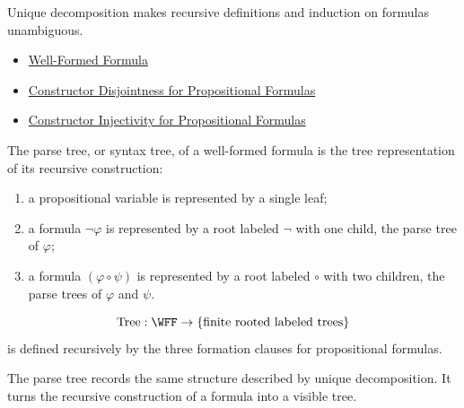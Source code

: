 \begin{remark*}[Interpretation]
Unique decomposition makes recursive definitions and induction on formulas unambiguous.
\end{remark*}

\begin{dependencies}
\begin{itemize}
  \item \hyperref[def:well-formed-formula]{Well-Formed Formula}
  \item \hyperref[lem:constructor-disjointness-propositional-formulas]{Constructor Disjointness for Propositional Formulas}
  \item \hyperref[lem:constructor-injectivity-propositional-formulas]{Constructor Injectivity for Propositional Formulas}
\end{itemize}
\end{dependencies}
\begin{tcolorbox}[colback=propbox, colframe=propborder, arc=2pt,
  left=6pt, right=6pt, top=4pt, bottom=4pt,
  title={\small\textbf{Definition (Parse Tree)}},
  fonttitle=\small\bfseries]
\begin{definition}
\label{def:parse-tree-propositional-logic}
The parse tree, or syntax tree, of a well-formed formula is the tree representation of its recursive construction:
\begin{enumerate}
\item a propositional variable is represented by a single leaf;
\item a formula \(\neg\varphi\) is represented by a root labeled \(\neg\) with one child, the parse tree of \(\varphi\);
\item a formula \((\varphi\circ\psi)\) is represented by a root labeled \(\circ\) with two children, the parse trees of \(\varphi\) and \(\psi\).
\end{enumerate}
\end{definition}
\end{tcolorbox}

\begin{remark*}
\[
\operatorname{Tree}:\WFF\to\{\text{finite rooted labeled trees}\}
\]
is defined recursively by the three formation clauses for propositional formulas.
\end{remark*}

\begin{remark*}[Interpretation]
The parse tree records the same structure described by unique decomposition. It turns the recursive construction of a formula into a visible tree.
\end{remark*}

